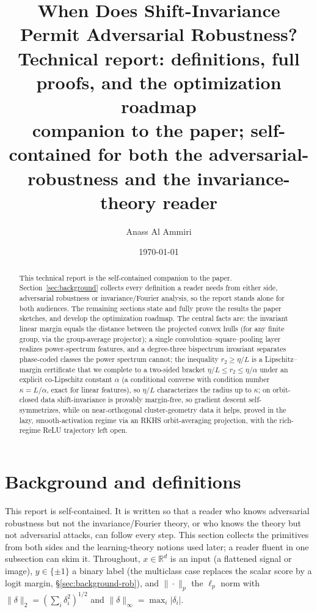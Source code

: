 \documentclass[11pt]{article}
\title{\textbf{When Does Shift-Invariance Permit Adversarial Robustness?}\\[2pt]
\large Technical report: definitions, full proofs, and the optimization roadmap\\[2pt]
\normalsize companion to the paper; self-contained for both the adversarial-robustness and the invariance-theory reader}
\author{Anass Al Ammiri}
\date{\today}
\theoremstyle{plain}
\theoremstyle{definition}
\theoremstyle{remark}
\newcommand{\R}{\mathbb{R}}
\begin{document}
\maketitle

\begin{abstract}
This technical report is the self-contained companion to the paper. Section~\ref{sec:background} collects every definition a reader needs from either side, adversarial robustness or invariance/Fourier analysis, so the report stands alone for both audiences. The remaining sections state and fully prove the results the paper sketches, and develop the optimization roadmap. The central facts are: the invariant linear margin equals the distance between the projected convex hulls (for any finite group, via the group-average projector); a single convolution--square--pooling layer realizes power-spectrum features, and a degree-three bispectrum invariant separates phase-coded classes the power spectrum cannot; the inequality $r_2\ge\eta/L$ is a Lipschitz--margin certificate that we complete to a two-sided bracket $\eta/L\le r_2\le\eta/\alpha$ under an explicit co-Lipschitz constant $\alpha$ (a conditional converse with condition number $\kappa=L/\alpha$, exact for linear features), so $\eta/L$ characterizes the radius up to $\kappa$; on orbit-closed data shift-invariance is provably margin-free, so gradient descent self-symmetrizes, while on near-orthogonal cluster-geometry data it helps, proved in the lazy, smooth-activation regime via an RKHS orbit-averaging projection, with the rich-regime ReLU trajectory left open.
\end{abstract}

\tableofcontents

\section{Background and definitions}\label{sec:background}
This report is self-contained.  It is written so that a reader who knows adversarial robustness but not the invariance/Fourier theory, or who knows the theory but not adversarial attacks, can follow every step.  This section collects the primitives from both sides and the learning-theory notions used later; a reader fluent in one subsection can skim it.  Throughout, $x\in\R^d$ is an input (a flattened signal or image), $y\in\{\pm1\}$ a binary label (the multiclass case replaces the scalar score by a logit margin, \S\ref{sec:background-rob}), and $\|\cdot\|_p$ the $\ell_p$ norm with $\|\delta\|_2=(\sum_i\delta_i^2)^{1/2}$ and $\|\delta\|_\infty=\max_i|\delta_i|$.
\end{document}

